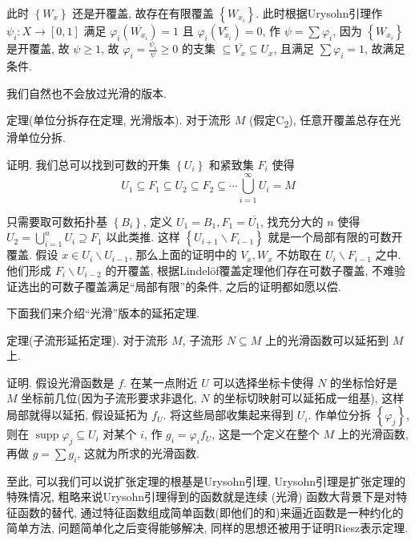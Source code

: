 \documentclass[options]{article}
\begin{document}
此时 $\left\{W_x\right\}$ 还是开覆盖, 故存在有限覆盖 $\left\{W_{x_i}\right\}$. 此时根据Urysohn引理作 $\psi_i: X \rightarrow[0,1]$ 满足 $\varphi_i\left(\overline{W_{x_i}}\right)=1$ 且 $\varphi_i\left(V_{x_i}^c\right)=0$, 作 $\psi=\sum \varphi_i$, 因为 $\left\{W_{x_i}\right\}$ 是开覆盖, 故 $\psi \geq 1$, 故 $\varphi_i=\frac{\psi_i}{\psi} \geq 0$ 的支集 $\subseteq \overline{V_x} \subseteq U_x$, 且满足 $\sum \varphi_i=1$, 故满足条件.

\begin{remark}
	我们自然也不会放过光滑的版本.

	\hrulefill

	定理(单位分拆存在定理, 光滑版本). 对于流形 $M$ (假定C\textsubscript{2}), 任意开覆盖总存在光滑单位分拆.
\end{remark}
证明. 我们总可以找到可数的开集 $\left\{U_i\right\}$ 和紧致集 $F_i$ 使得
\[
		U_1 \subseteq F_1 \subseteq U_2 \subseteq F_2 \subseteq \cdots \bigcup_{i=1}^{\infty} U_i=M
\]

只需要取可数拓扑基 $\left\{B_i\right\}$, 定义 $U_1=B_1, F_1=\overline{U_1}$, 找充分大的 $n$ 使得 $U_2=\bigcup_{i=1}^n U_i \supseteq F_1$ 以此类推. 这样 $\left\{U_{i+1} \backslash F_{i-1}\right\}$ 就是一个局部有限的可数开覆盖. 假设 $x \in U_i \backslash U_{i-1}$, 那么上面的证明中的 $V_x, W_x$ 不妨取在 $U_i \backslash F_{i-1}$ 之中. 他们形成 $F_i \backslash U_{i-2}$ 的开覆盖, 根据Lindelöf覆盖定理他们存在可数子覆盖, 不难验证选出的可数子覆盖满足“局部有限”的条件, 之后的证明都如愿以偿.

\begin{remark}
	下面我们来介绍“光滑”版本的延拓定理.

	\hrulefill

	定理(子流形延拓定理). 对于流形 $M$, 子流形 $N \subseteq M$ 上的光滑函数可以延拓到 $M$ 上.
\end{remark}
证明. 假设光滑函数是 $f$. 在某一点附近 $U$ 可以选择坐标卡使得 $N$ 的坐标恰好是 $M$ 坐标前几位(因为子流形要求非退化, $N$ 的坐标切映射可以延拓成一组基), 这样局部就得以延拓, 假设延拓为 $f_U$. 将这些局部收集起来得到 $U_i$. 作单位分拆 $\left\{\varphi_j\right\}$, 则在 $\operatorname{supp} \varphi_j \subseteq U_i$ 对某个 $i$, 作 $g_i=\varphi_i f_U$, 这是一个定义在整个 $M$ 上的光滑函数, 再做 $g=\sum g_i$, 这就为所求的光滑函数.

至此, 可以我们可以说扩张定理的根基是Urysohn引理, Urysohn引理是扩张定理的特殊情况, 粗略来说Urysohn引理得到的函数就是连续 (光滑) 函数大背景下是对特征函数的替代, 通过特征函数组成简单函数(即他们的和)来逼近函数是一种约化的简单方法, 问题简单化之后变得能够解决, 同样的思想还被用于证明Riesz表示定理.
\end{document}
